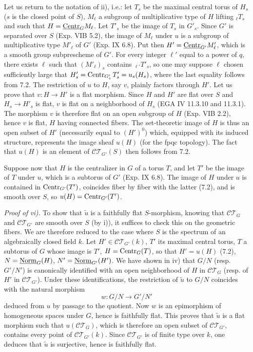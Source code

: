 Let us return to the notation of ii), i.e.: let $T_s$ be the maximal central torus of $H_s$ ($s$ is the closed point of $S$), $M_\ell$ a subgroup of multiplicative type of $H$ lifting ${}_\ell T_s$ and such that $H=\underline{\mathrm{Centr}}_G M_\ell$. Let $T'_s$ be the image of $T_s$ in $G'_s$. Since $G'$ is separated over $S$ (Exp. VIB 5.2), the image of $M_\ell$ under $u$ is a subgroup of multiplicative type $M'_\ell$ of $G'$ (Exp. IX 6.8). Put then $H'=\underline{\mathrm{Centr}}_{G'}M'_\ell$, which is a smooth group subprescheme of $G'$. For every integer $\ell'$ equal to a power of $q$, there exists $\ell$ such that $(M'_\ell)_s$ contains ${}_{\ell'}T'_s$, so one may suppose $\ell$ chosen sufficiently large that $H'_s=\operatorname{Centr}_{G'_s}T'_s=u_s(H_s)$, where the last equality follows from 7.2. The restriction of $u$ to $H$, say $v$, plainly factors through $H'$. Let us prove that $v:H\to H'$ is a flat morphism. Since $H$ and $H'$ are flat over $S$ and $H_s\to H'_s$ is flat, $v$ is flat on a neighborhood of $H_s$ (EGA IV 11.3.10 and 11.3.1). The morphism $v$ is therefore flat on an open subgroup of $H$ (Exp. VIB 2.2), hence $v$ is flat, $H$ having connected fibers. The set-theoretic image of $H$ is thus an open subset of $H'$ (necessarily equal to $(H')^0$) which, equipped with its induced structure, represents the image sheaf $u(H)$ (for the fpqc topology). The fact that $u(H)$ is an element of $\mathscr{CT}_{G'}(S)$ then follows from 7.2.

Suppose now that $H$ is the centralizer in $G$ of a torus $T$, and let $T'$ be the image of $T$ under $u$, which is a subtorus of $G'$ (Exp. IX 6.8). The image of $H$ under $u$ is contained in $\operatorname{Centr}_{G'}(T')$, coincides fiber by fiber with the latter (7.2), and is smooth over $S$, so $u(H)=\operatorname{Centr}_{G'}(T')$.

\par\noindent\emph{Proof of vi).}
To show that $\widetilde u$ is a faithfully flat $S$-morphism, knowing that $\mathscr{CT}_G$ and $\mathscr{CT}_{G'}$ are smooth over $S$ (by i)), it suffices to check this on the geometric fibers. We are therefore reduced to the case where $S$ is the spectrum of an algebraically closed field $k$. Let $H'\in\mathscr{CT}_{G'}(k)$, $T'$ its maximal central torus, $T$ a subtorus of $G$ whose image is $T'$, $H=\operatorname{Centr}_G(T)$, so that $H'=u(H)$ (7.2), $N=\underline{\mathrm{Norm}}_G(H)$, $N'=\underline{\mathrm{Norm}}_{G'}(H')$. We have shown in iv) that $G/N$ (resp. $G'/N'$) is canonically identified with an open neighborhood of $H$ in $\mathscr{CT}_G$ (resp. of $H'$ in $\mathscr{CT}_{G'}$). Under these identifications, the restriction of $\widetilde u$ to $G/N$ coincides with the natural morphism
\[
w:G/N\longrightarrow G'/N'
\]
deduced from $u$ by passage to the quotient. Now $w$ is an epimorphism of homogeneous spaces under $G$, hence is faithfully flat. This proves that $\widetilde u$ is a flat morphism such that $u(\mathscr{CT}_G)$, which is therefore an open subset of $\mathscr{CT}_{G'}$, contains every point of $\mathscr{CT}_{G'}(k)$. Since $\mathscr{CT}_{G'}$ is of finite type over $k$, one deduces that $\widetilde u$ is surjective, hence is faithfully flat.


